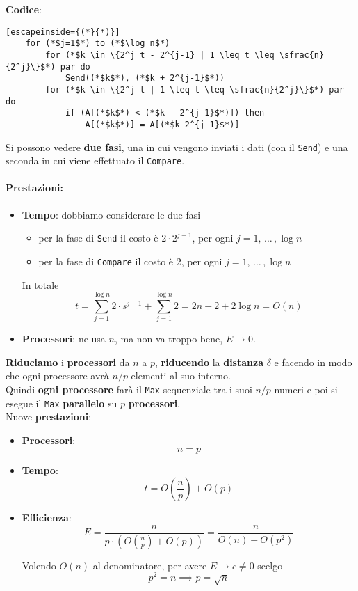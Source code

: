 \textbf{Codice}: 
\begin{lstlisting}[escapeinside={(*}{*)}]
	for (*$j=1$*) to (*$\log n$*)
		for (*$k \in \{2^j t - 2^{j-1} | 1 \leq t \leq \sfrac{n}{2^j}\}$*) par do
			Send((*$k$*), (*$k + 2^{j-1}$*))
		for (*$k \in \{2^j t | 1 \leq t \leq \sfrac{n}{2^j}\}$*) par do
			if (A[(*$k$*) < (*$k - 2^{j-1}$*)]) then 
				A[(*$k$*)] = A[(*$k-2^{j-1}$*)]
\end{lstlisting}

Si possono vedere \textbf{due fasi}, una in cui vengono inviati i dati (con il \texttt{Send}) e una seconda in cui viene effettuato il \texttt{Compare}.\\

\paragraph{Prestazioni:}
\begin{itemize}
	\item \textbf{Tempo}: dobbiamo considerare le due fasi
	\begin{itemize}
		\item per la fase di \texttt{Send} il costo è $2 \cdot 2^{j-1}$, per ogni $j = 1, \, \dots \, , \log n$
		\item per la fase di \texttt{Compare} il costo è $2$, per ogni $j = 1, \, \dots \,, \log n$
	\end{itemize}
	In totale
	$$ t = \sum_{j=1}^{\log n} 2 \cdot s^{j-1} + \sum_{j=1}^{\log n} 2 = 2n-2 + 2 \log n = O(n) $$
	\nn
	
	\item \textbf{Processori}: ne usa $n$, ma non va troppo bene, $E \rightarrow 0$.\\
\end{itemize}

\newpage

\textbf{Riduciamo} i \textbf{processori} da $n$ a $p$, \textbf{riducendo} la \textbf{distanza} $\delta$ e facendo in modo che ogni processore avrà $n/p$ elementi al suo interno. \\

Quindi \textbf{ogni processore} farà il \texttt{Max} sequenziale tra i suoi $n/p$ numeri e poi si esegue il \texttt{Max} \textbf{parallelo} su $p$ \textbf{processori}. \\

Nuove \textbf{prestazioni}: 
\begin{itemize}
	\item \textbf{Processori}: 
	$$ n = p$$
	
	\item \textbf{Tempo}:
	$$ t = O\left(\frac{n}{p}\right) + O(p)$$
	
	\item \textbf{Efficienza}:
	$$ E = \frac{n}{ p \cdot \left(O\left(\frac{n}{p}\right) + O(p)\right)} = \frac{n}{O(n) + O(p^2)}$$
	
	Volendo $O(n)$ al denominatore, per avere $E \rightarrow c \neq 0$ scelgo 
	$$p^2 = n \implies p = \sqrt{n}$$
	\nn
\end{itemize}

